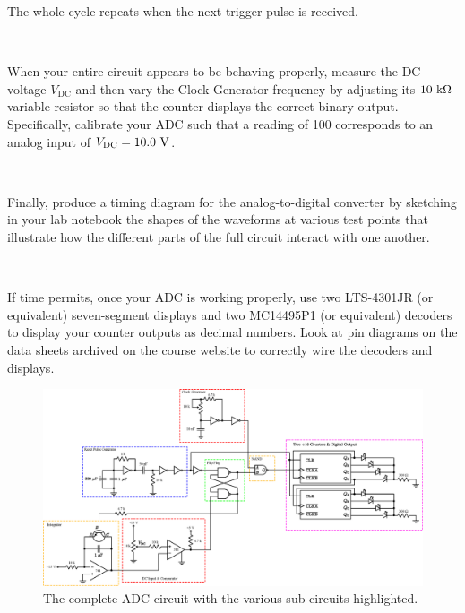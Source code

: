 \documentclass[12pt,oneside,openany,letterpaper]{article}
\begin{document}
\noindent The whole cycle repeats when the next trigger pulse is received.

~

\noindent When your entire circuit appears to be behaving properly, measure the DC voltage $V_\mathrm{DC}$ and then vary the Clock Generator frequency by adjusting its $10\rm\ k\Omega$ variable resistor so that the counter displays the correct binary output. Specifically, calibrate your ADC such that a reading of 100 corresponds to an analog input of $V_\mathrm{DC} = 10.0\rm\ V$.

~

\noindent Finally, produce a timing diagram for the analog-to-digital converter by sketching in your lab notebook the shapes of the waveforms at various test points that illustrate how the different parts of the full circuit interact with one another.

~

\noindent If time permits, once your ADC is working properly, use two LTS-4301JR (or equivalent) seven-segment displays and two MC14495P1 (or equivalent) decoders to display your counter outputs as decimal numbers.  Look at pin diagrams on the data sheets archived on the course website to correctly wire the decoders and displays.

\begin{figure}[ht]
\centering
    \includegraphics[width=1.2\textwidth, angle=90]{figures/ADC.eps}%
    \caption{The complete ADC circuit with the various sub-circuits highlighted.}
    \label{fig:ADC}
\end{figure}
\end{document}
